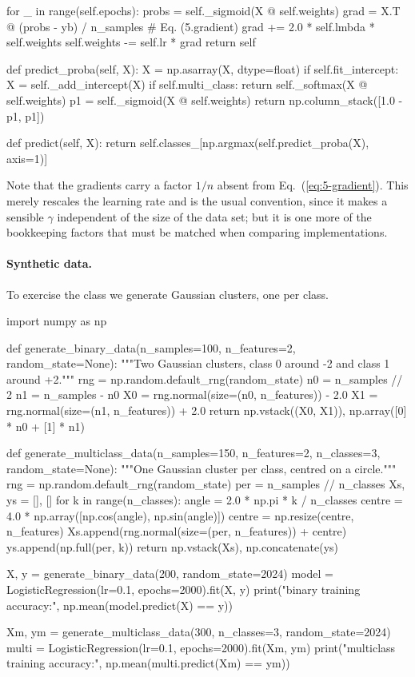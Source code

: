 \begin{Python}{}
            for _ in range(self.epochs):
                probs = self._sigmoid(X @ self.weights)
                grad = X.T @ (probs - yb) / n_samples       # Eq. (5.gradient)
                grad += 2.0 * self.lmbda * self.weights
                self.weights -= self.lr * grad
        return self

    def predict_proba(self, X):
        X = np.asarray(X, dtype=float)
        if self.fit_intercept:
            X = self._add_intercept(X)
        if self.multi_class:
            return self._softmax(X @ self.weights)
        p1 = self._sigmoid(X @ self.weights)
        return np.column_stack([1.0 - p1, p1])

    def predict(self, X):
        return self.classes_[np.argmax(self.predict_proba(X), axis=1)]
\end{Python}

Note that the gradients carry a factor $1/n$ absent from
Eq.~(\ref{eq:5-gradient}).  This merely rescales the learning rate and is the
usual convention, since it makes a sensible $\gamma$ independent of the size of
the data set; but it is one more of the bookkeeping factors that must be
matched when comparing implementations.

\paragraph{Synthetic data.}
To exercise the class we generate Gaussian clusters, one per class.

\begin{Python}{}
import numpy as np

def generate_binary_data(n_samples=100, n_features=2, random_state=None):
    """Two Gaussian clusters, class 0 around -2 and class 1 around +2."""
    rng = np.random.default_rng(random_state)
    n0 = n_samples // 2
    n1 = n_samples - n0
    X0 = rng.normal(size=(n0, n_features)) - 2.0
    X1 = rng.normal(size=(n1, n_features)) + 2.0
    return np.vstack((X0, X1)), np.array([0] * n0 + [1] * n1)


def generate_multiclass_data(n_samples=150, n_features=2, n_classes=3,
                             random_state=None):
    """One Gaussian cluster per class, centred on a circle."""
    rng = np.random.default_rng(random_state)
    per = n_samples // n_classes
    Xs, ys = [], []
    for k in range(n_classes):
        angle = 2.0 * np.pi * k / n_classes
        centre = 4.0 * np.array([np.cos(angle), np.sin(angle)])
        centre = np.resize(centre, n_features)
        Xs.append(rng.normal(size=(per, n_features)) + centre)
        ys.append(np.full(per, k))
    return np.vstack(Xs), np.concatenate(ys)


X, y = generate_binary_data(200, random_state=2024)
model = LogisticRegression(lr=0.1, epochs=2000).fit(X, y)
print("binary training accuracy:", np.mean(model.predict(X) == y))

Xm, ym = generate_multiclass_data(300, n_classes=3, random_state=2024)
multi = LogisticRegression(lr=0.1, epochs=2000).fit(Xm, ym)
print("multiclass training accuracy:", np.mean(multi.predict(Xm) == ym))
\end{Python}

